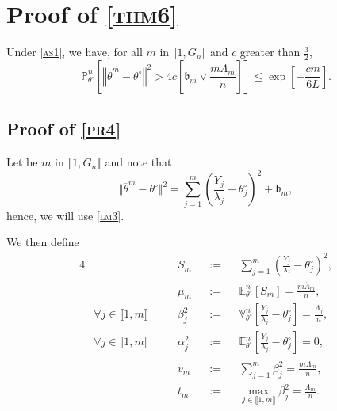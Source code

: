 \section{Proof of \textsc{\cref{thm6}}}

\begin{pr}\label{pr4}
Under \textsc{\cref{as1}}, we have, for all $m$ in $\llbracket 1, G_{n} \rrbracket$ and $c$ greater than $\frac{3}{2}$,
\[\mathds{P}_{\theta^{\circ}}^{n}\left[\left\Vert \overline{\theta}^{m} - \theta^{\circ} \right\Vert^{2} > 4 c \left[\mathfrak{b}_{m} \vee \frac{m \overline{\Lambda}_{m}}{n}\right]\right] \leq \exp\left[-\frac{c m}{6 L}\right].\]
\end{pr}

\subsection{Proof of \textsc{\cref{pr4}}}
Let be $m$ in $\llbracket 1, G_{n} \rrbracket$ and note that
\[\Vert \overline{\theta}^{m} - \theta^{\circ} \Vert^{2} = \sum\limits_{j = 1}^{m} \left(\frac{Y_{j}}{\lambda_{j}} - \theta^{\circ}_{j}\right)^{2} + \mathfrak{b}_{m},\]
hence, we will use \textsc{\cref{lm3}}.

We then define 
\begin{alignat*}{4}
& && S_{m} && := && \sum\limits_{j = 1}^{m} \left(\frac{Y_{j}}{\lambda_{j}} - \theta^{\circ}_{j}\right)^{2},\\
& && \mu_{m} && := && \mathds{E}_{\theta^{\circ}}^{n}\left[S_{m}\right] = \frac{m \overline{\Lambda}_{m}}{n},\\
& \forall j \in \llbracket 1, m \rrbracket \quad && \beta_{j}^{2} && := && \mathds{V}_{\theta^{\circ}}^{n}\left[\frac{Y_{j}}{\lambda_{j}} - \theta^{\circ}_{j}\right] = \frac{\Lambda_{j}}{n},\\
& \forall j \in \llbracket 1, m \rrbracket \quad && \alpha_{j}^{2} && := && \mathds{E}_{\theta^{\circ}}^{n}\left[\frac{Y_{j}}{\lambda_{j}} - \theta^{\circ}_{j}\right] = 0,\\
& && v_{m} && := && \sum\limits_{j = 1}^{m}\beta_{j}^{2} = \frac{m \overline{\Lambda}_{m}}{n},\\
& && t_{m} && := && \max\limits_{j \in \llbracket 1, m \rrbracket}\beta_{j}^{2} = \frac{\Lambda_{m}}{n}.
\end{alignat*}

